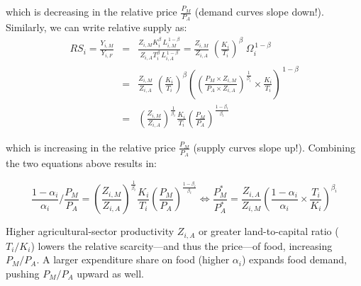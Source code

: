 \documentclass[11pt,letterpaper]{article}
\begin{document}
{\noindent which is decreasing in the relative price $\frac{P_{M}}{P_{A}}$ (demand curves slope down!). Similarly, we can write relative supply as:
{\scriptsize
\begin{eqnarray}
    RS_i = \frac{Y_{i,M}}{Y_{i,F}}
  &=& \frac{Z_{i,M}K_i^{\beta}\,L_{i,M}^{\,1-\beta}}
          {Z_{i,A}T_i^{\beta}\,L_{i,A}^{\,1-\beta}}
   =\frac{Z_{i,M}}{Z_{i,A}}\;
     \left( \frac{K_i}{T_i} \right)^{\beta}\;
     \Omega_i^{\,1-\beta} \nonumber \\
     &=& \frac{Z_{i,M}}{Z_{i,A}}\;
     \left( \frac{K_i}{T_i} \right)^{\beta} \left( \left( \frac{P_{M} \times  Z_{i,M}}{P_{A} \times  Z_{i,A}} \right)^{\frac{1}{\beta_i}} \times  \frac{K_{i}}{T_{i}} \right)^{\,1-\beta} \nonumber  \\
     &=& \left( \frac{Z_{i,M}}{Z_{i,A}} \right)^{\frac{1}{\beta_i}} \frac{K_i}{T_i}   \left( \frac{P_{M} }{P_{A} } \right)^{\frac{1-\beta_i}{\beta_i}} 
\end{eqnarray}
}

which is increasing in the relative price $\frac{P_{M}}{P_{A}}$ (supply curves slope up!). Combining the two equations above results in:

\begin{equation}\label{eq: eqm-prices}
    \frac{1-\alpha_i}{\alpha_i} / \frac{P_{M}}{P_{A}} = \left( \frac{Z_{i,M}}{Z_{i,A}} \right)^{\frac{1}{\beta_i}} \frac{K_i}{T_i}   \left( \frac{P_{M} }{P_{A} } \right)^{\frac{1-\beta_i}{\beta_i}}  \iff \frac{P_{M}^*}{P_{A}^*} =  \frac{Z_{i,A}}{Z_{i,M}} \left( \frac{1-\alpha_i}{\alpha_i} \times \frac{T_i}{K_i} \right)^{\beta_i}
\end{equation}

Higher agricultural-sector productivity $Z_{i,A}$ or greater land-to-capital ratio ($T_i / K_i$) lowers the relative scarcity—and thus the price—of food, increasing 
$P_M / P_A$. A larger expenditure share on food (higher $\alpha_i$) expands food demand, pushing $P_M / P_A$ upward as well.

\begin{figure}
    \centering
\end{figure}}
\end{document}
